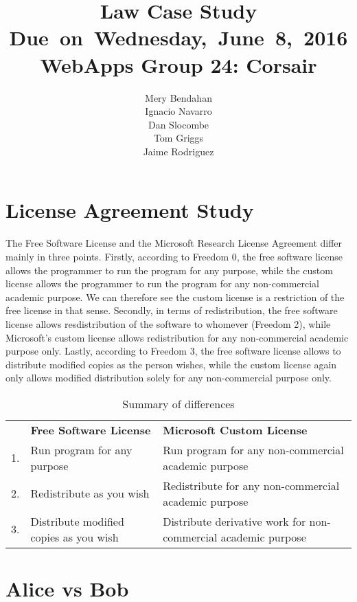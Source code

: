 \documentclass{article}
\title{
\vspace{2in}
\textmd{\textbf{Law Case Study}}\\
\normalsize\vspace{0.1in}\small{Due\ on\ Wednesday,\ June\ 8,\ 2016}\\
\vspace{0.1in}\large{\textbf{WebApps Group 24: Corsair}}
\vspace{3in}
}
\author{Mery Bendahan \\ Ignacio Navarro \\ Dan Slocombe \\ Tom Griggs \\ Jaime Rodriguez}
\date{}
\renewcommand{\_}{\char`_}
\begin{document}
\maketitle
\newpage

\section{License Agreement Study}

The Free Software License and the Microsoft Research License Agreement differ mainly in three points. Firstly, according to Freedom 0,  the free software license allows the programmer to run the program for any purpose, while the custom license allows the programmer to run the program for any non-commercial academic purpose. We can therefore see the custom license is a restriction of the free license in that sense. Secondly, in terms of redistribution, the free software license allows resdistribution of the software to whomever (Freedom 2), while Microsoft's custom license allows redistribution for any non-commercial academic purpose only. Lastly, according to Freedom 3, the free software license allows to distribute modified copies as the person wishes, while the custom license again only allows modified distribution solely for any non-commercial purpose only.

\begin{table}[H]
\centering
\caption{Summary of differences}
\label{my-label}
\begin{tabular}{l|l|l|}
\cline{2-3}
   & \textbf{Free Software License}         & \textbf{Microsoft Custom License}                              \\ \cline{2-3} 
1. & Run program for any purpose            & Run program for any non-commercial academic purpose            \\ \cline{2-3} 
2. & Redistribute as you wish               & Redistribute for any non-commercial academic purpose           \\ \cline{2-3} 
3. & Distribute modified copies as you wish & Distribute derivative work for non-commercial academic purpose \\ \cline{2-3} 
\end{tabular}
\end{table}

\section{Alice vs Bob}


\end{document}
